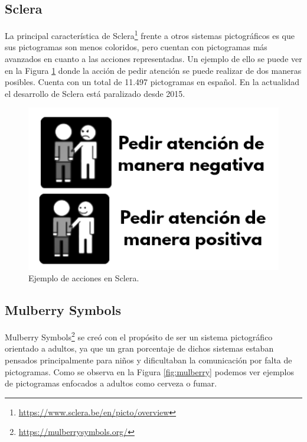 \subsection{Sclera}
La principal característica de Sclera\footnote{\url{https://www.sclera.be/en/picto/overview}} frente a otros sistemas pictográficos es que sus pictogramas son menos coloridos, pero cuentan con pictogramas más avanzados en cuanto a las acciones representadas. Un ejemplo de ello se puede ver en la Figura \ref{fig:sclera} donde la acción de pedir atención se puede realizar de dos maneras posibles. Cuenta con un total de 11.497 pictogramas en español. En la actualidad el desarrollo de Sclera está paralizado desde 2015.



\begin{figure}[h!]
	\centering
	\includegraphics[scale=0.4]{Imagenes/Bitmap/Sclera}
	\caption{Ejemplo de acciones en Sclera.}
	\label{fig:sclera}
\end{figure}


\subsection{Mulberry Symbols}
\label{cap3:sec:mulberry}
Mulberry Symbols\footnote{\url{https://mulberrysymbols.org/}} se creó con el propósito de ser un sistema pictográfico orientado a adultos, ya que un gran porcentaje de dichos sistemas estaban pensados principalmente para niños y dificultaban la comunicación por falta de pictogramas. Como se observa en la Figura \ref{fig:mulberry} podemos ver ejemplos de pictogramas enfocados a adultos como cerveza o fumar.


